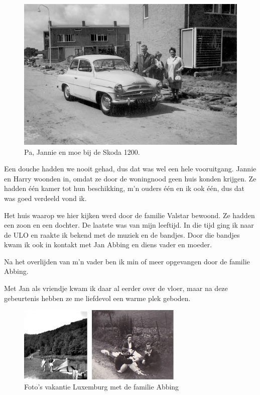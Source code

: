 \documentclass[10pt,twoside, openright]{memoir}
\begin{document}
\begin{figure}
\includegraphics[width=\textwidth]{img/ch21/skoda}
\caption*{\footnotesize Pa, Jannie en moe bij de Skoda 1200.}
\end{figure}

Een douche hadden we nooit gehad, dus dat was wel een hele vooruitgang. Jannie en Harry woonden in, omdat ze door de woningnood geen huis konden krijgen. Ze hadden één kamer tot hun beschikking, m’n ouders één en ik ook één, dus dat was goed verdeeld vond ik. 

Het huis waarop we hier kijken werd door de familie Valstar bewoond. Ze hadden een zoon en een dochter. De laatste was van mijn leeftijd. In die tijd ging ik naar de ULO en raakte ik bekend met de muziek en de bandjes. Door die bandjes kwam ik ook in kontakt met Jan Abbing en diens vader en moeder. 

Na het overlijden van m’n vader ben ik min of meer opgevangen door de familie Abbing. 

Met Jan als vriendje kwam ik daar al eerder over de vloer, maar na deze gebeurtenis hebben ze me liefdevol een warme plek geboden.

\begin{figure}
\includegraphics[width=\textwidth]{img/ch21/luxvak}
\caption*{\footnotesize Foto’s vakantie Luxemburg met de familie Abbing}
\end{figure}
\end{document}
